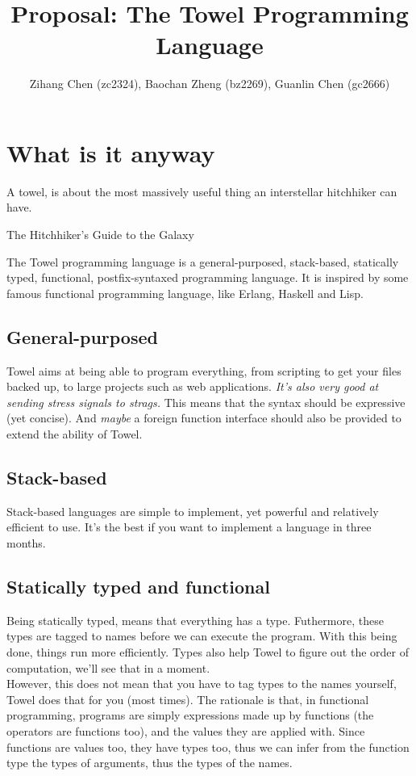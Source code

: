 \documentclass{article}
\title{Proposal: The Towel Programming Language}
\author{Zihang Chen (zc2324), Baochan Zheng (bz2269), Guanlin Chen (gc2666)}
\begin{document}
\maketitle
\tableofcontents

\section{What is it anyway}

\epigraph{A towel, is about the most massively useful thing an interstellar hitchhiker can have.}{The Hitchhiker's Guide to the Galaxy}

The Towel programming language is a general-purposed, stack-based, statically typed, functional, postfix-syntaxed programming language. It is inspired by some famous functional programming language, like Erlang, Haskell and Lisp.

\subsection{General-purposed}

Towel aims at being able to program everything, from scripting to get your files backed up, to large projects such as web applications. \textit{It's also very good at sending stress signals to strags.} This means that the syntax should be expressive (yet concise). And \textit{maybe} a foreign function interface should also be provided to extend the ability of Towel.

\subsection{Stack-based}

Stack-based languages are simple to implement, yet powerful and relatively efficient to use. It's the best if you want to implement a language in three months.

\subsection{Statically typed and functional}

Being statically typed, means that everything has a type. Futhermore, these types are tagged to names before we can execute the program. With this being done, things run more efficiently. Types also help Towel to figure out the order of computation, we'll see that in a moment.\\

However, this does not mean that you have to tag types to the names yourself, Towel does that for you (most times). The rationale is that, in functional programming, programs are simply expressions made up by functions (the operators are functions too), and the values they are applied with. Since functions are values too, they have types too, thus we can infer from the function type the types of arguments, thus the types of the names.\\
\end{document}
